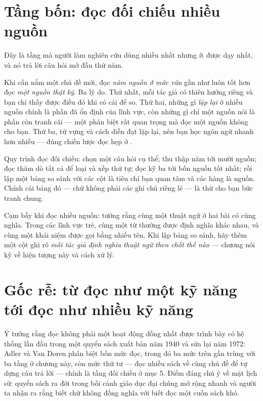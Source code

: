 \documentclass[../../english.tex]{subfiles}
\begin{document}
\section{Tầng bốn: đọc đối chiếu nhiều nguồn}

Đây là tầng mà người làm nghiên cứu dùng nhiều nhất nhưng ít được dạy nhất, và nó trả lời câu hỏi mở đầu thứ năm.

Khi cần nắm một chủ đề mới, đọc \emph{năm nguồn ở mức vừa} gần như luôn tốt hơn đọc \emph{một nguồn thật kỹ}. Ba lý do. Thứ nhất, mỗi tác giả có thiên hướng riêng và bạn chỉ thấy được điều đó khi có cái để so. Thứ hai, những gì \emph{lặp lại} ở nhiều nguồn chính là phần đã ổn định của lĩnh vực, còn những gì chỉ một nguồn nói là phần còn tranh cãi --- một phân biệt rất quan trọng mà đọc một nguồn không cho bạn. Thứ ba, từ vựng và cách diễn đạt lặp lại, nên bạn học ngôn ngữ nhanh hơn nhiều --- đúng chiến lược đọc hẹp ở .

Quy trình đọc đối chiếu: chọn một câu hỏi cụ thể; thu thập năm tới mười nguồn; đọc thăm dò tất cả để loại và xếp thứ tự; đọc kỹ ba tới bốn nguồn tốt nhất; rồi lập một bảng so sánh với các cột là tiêu chí bạn quan tâm và các hàng là nguồn. Chính cái bảng đó --- chứ không phải các ghi chú riêng lẻ --- là thứ cho bạn bức tranh chung.

\begin{cambay}
Cạm bẫy khi đọc nhiều nguồn: tưởng rằng cùng một thuật ngữ ở hai bài có cùng nghĩa. Trong các lĩnh vực trẻ, cùng một từ thường được định nghĩa khác nhau, và cùng một khái niệm được gọi bằng nhiều tên. Khi lập bảng so sánh, hãy thêm một cột ghi rõ \emph{mỗi tác giả định nghĩa thuật ngữ then chốt thế nào} --- chương  nói kỹ về hiện tượng này và cách xử lý.
\end{cambay}

\section{Gốc rễ: từ đọc như một kỹ năng tới đọc như nhiều kỹ năng}

Ý tưởng rằng đọc không phải một hoạt động đồng nhất được trình bày có hệ thống lần đầu trong một quyển sách xuất bản năm 1940 và sửa lại năm 1972: Adler và Van Doren phân biệt bốn mức đọc, trong đó ba mức trên gần trùng với ba tầng ở chương này, còn mức thứ tư --- đọc nhiều sách về cùng chủ đề để tự dựng câu trả lời --- chính là tầng đối chiếu ở mục 5\cite{adler1972}. Điểm đáng chú ý về mặt lịch sử: quyển sách ra đời trong bối cảnh giáo dục đại chúng mở rộng nhanh và người ta nhận ra rằng biết chữ không đồng nghĩa với biết đọc một cuốn sách khó.
\end{document}
